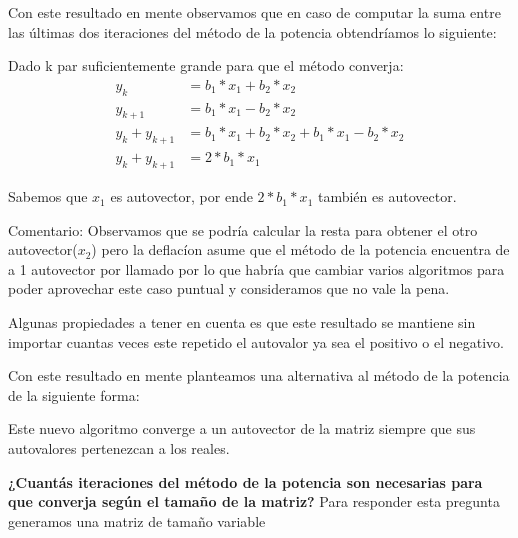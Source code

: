 Con este resultado en mente observamos que en caso de computar la suma entre las últimas dos iteraciones del método de la potencia obtendríamos lo siguiente:

\vspace{1em}
Dado k par suficientemente grande para que el método converja: 
\begin{align}
    y_k &= b_1 * x_1 + b_2 * x_2 \\ 
    y_{k+1} &= b_1 * x_1 - b_2 * x_2 \\ 
    y_k + y_{k+1} &= b_1 * x_1 + b_2 * x_2 + b_1 * x_1 - b_2 * x_2 \\ 
    y_k + y_{k+1} &= 2 * b_1 * x_1
\end{align}

Sabemos que $x_1$ es autovector, por ende $2 * b_1 * x_1$ también es autovector.

\vspace{1em}

Comentario: Observamos que se podría calcular la resta para obtener el otro autovector($x_2$) pero la deflacíon asume que el método de la potencia encuentra de a 1 autovector por llamado por lo que habría que cambiar varios algoritmos para poder aprovechar este caso puntual y consideramos que no vale la pena.

\vspace{1em}

Algunas propiedades a tener en cuenta es que este resultado se mantiene sin importar cuantas veces este repetido el autovalor ya sea el positivo o el negativo.

\vspace{1em}
Con este resultado en mente planteamos una alternativa al método de la potencia de la siguiente forma:

\vspace{1em}


\vspace{1em}
Este nuevo algoritmo converge a un autovector de la matriz siempre que sus autovalores pertenezcan a los reales.

\vspace{1em}

\begin{large}  
    \textbf{¿Cuantás iteraciones del método de la potencia son necesarias para que converja según el tamaño de la matriz?}
    \vspace{1em}
    Para responder esta pregunta generamos una matriz de tamaño variable

\end{large}  
